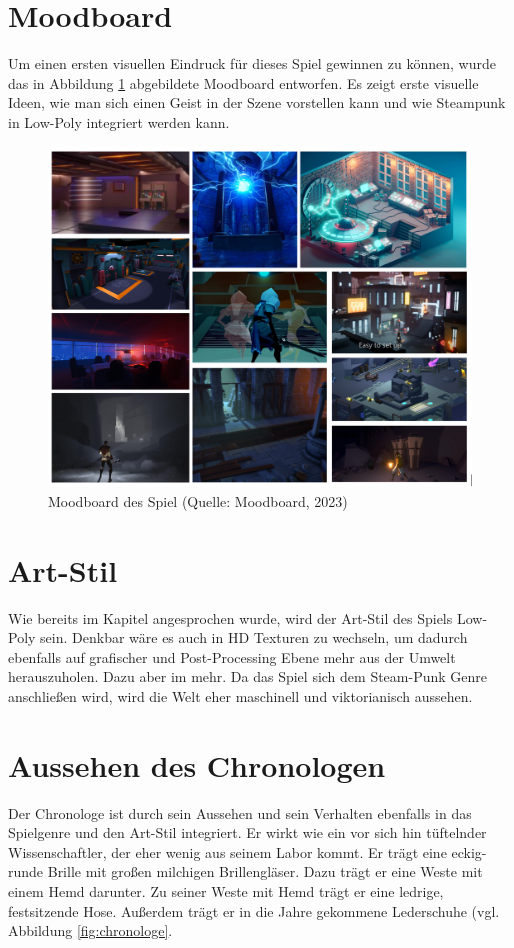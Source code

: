 \section{Moodboard}\label{sec:moodboard}
Um einen ersten visuellen Eindruck für dieses Spiel gewinnen  zu können, wurde das in Abbildung \ref{fig:moodboard} abgebildete Moodboard entworfen. Es zeigt erste visuelle Ideen, wie man sich einen Geist in der Szene vorstellen kann und wie Steampunk in Low-Poly integriert werden kann.

\begin{figure}[ht]
\centering
\includegraphics[width=0.8\linewidth]{content/pictures/Game_Atmo.jpg}
\caption{Moodboard des Spiel (Quelle: Moodboard, 2023)}
\label{fig:moodboard}
\end{figure}


\section{Art-Stil}
Wie bereits im Kapitel  angesprochen wurde, wird der Art-Stil des Spiels Low-Poly sein. Denkbar wäre es auch in \ac{HD} Texturen zu wechseln, um dadurch ebenfalls auf grafischer und Post-Processing Ebene mehr aus der Umwelt herauszuholen. Dazu aber im  mehr. Da das Spiel sich dem Steam-Punk Genre anschließen wird, wird die Welt eher maschinell und viktorianisch aussehen.

\section{Aussehen des Chronologen}
Der Chronologe ist durch sein Aussehen und sein Verhalten ebenfalls in das Spielgenre und den Art-Stil integriert. Er wirkt wie ein vor sich hin tüftelnder Wissenschaftler, der eher wenig aus seinem Labor kommt. Er trägt eine eckig-runde Brille mit großen milchigen Brillengläser. Dazu trägt er eine Weste mit einem Hemd darunter. Zu seiner Weste mit Hemd trägt er eine ledrige, festsitzende Hose. Außerdem trägt er in die Jahre gekommene Lederschuhe (vgl. Abbildung \ref{fig:chronologe}.

